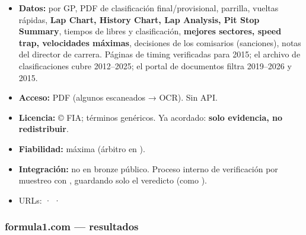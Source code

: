 \begin{itemize}
\item \textbf{Datos:} por GP, PDF de clasificación final/provisional, parrilla, vueltas rápidas, \textbf{Lap Chart, History Chart, Lap Analysis, Pit Stop Summary}, tiempos de libres y clasificación, \textbf{mejores sectores, speed trap, velocidades máximas}, decisiones de los comisarios (sanciones), notas del director de carrera. Páginas de timing verificadas para 2015; el archivo de clasificaciones cubre 2012–2025; el portal de documentos filtra 2019–2026 y 2015.
\item \textbf{Acceso:} PDF (algunos escaneados → OCR). Sin API.
\item \textbf{Licencia:} © FIA; términos genéricos. Ya acordado: \textbf{solo evidencia, no redistribuir}.
\item \textbf{Fiabilidad:} máxima (árbitro en ).
\item \textbf{Integración:} no en bronze público. Proceso interno de verificación por muestreo con , guardando solo el veredicto (como ).
\item URLs: \href{https://www.fia.com/documents/championships/fia-formula-one-world-championship-14}{} · \href{https://www.fia.com/events/fia-formula-one-world-championship/season-2015/event-timing-information-3}{} · \href{https://api.fia.com/f1-archives}{}
\end{itemize}

\subsubsection{formula1.com — resultados}

